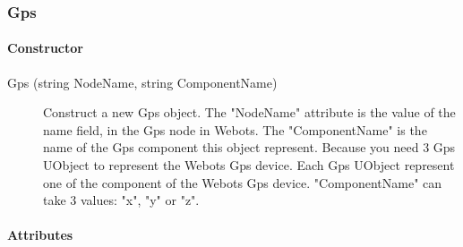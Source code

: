 \subsubsection{Gps}
\label{webots.uobjects.robotdevices.gps}%

\paragraph{Constructor}
\label{webots.uobjects.robotdevices.gps.constructor}%

\noindent
\begin{description}
\item[{Gps (string NodeName, string ComponentName)}] Construct a new
  Gps object.  The "NodeName" attribute is the value of the name
  field, in the Gps node in Webots.  The "ComponentName" is the name
  of the Gps component this object represent.  Because you need 3 Gps
  UObject to represent the Webots Gps device. Each Gps UObject
  represent one of the component of the Webots Gps device.
  "ComponentName" can take 3 values: "x", "y" or "z".

\end{description}

\paragraph{Attributes}
\label{webots.uobjects.robotdevices.gps.attributes}%

